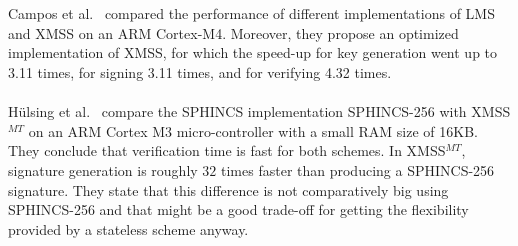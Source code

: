 \\  \\
Campos et al.~\cite{fabio_paper_lms_vs_xmss} compared the performance of different implementations of LMS and XMSS on an ARM Cortex-M4. Moreover, they propose an optimized implementation of XMSS, for which the speed-up for key generation went up to 3.11 times, for signing 3.11 times, and for verifying 4.32 times.
\\ \\
Hülsing et al.~\cite{armed_sphincs_2015} compare the SPHINCS implementation SPHINCS-256 with XMSS$^{MT}$ on an ARM Cortex M3 micro-controller with a small RAM size of 16KB. They conclude that verification time is fast for both schemes. In XMSS$^{MT}$, signature generation is roughly $32$ times faster than producing a SPHINCS-256 signature. They state that this difference is not comparatively big using SPHINCS-256 and that might be a good trade-off for getting the flexibility provided by a stateless scheme anyway.



